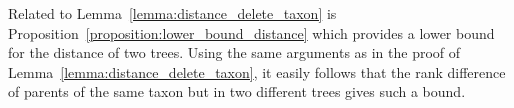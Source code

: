 \documentclass{amsart}
\newcommand{\parent}{\mathrm{parent}}
\newcommand{\rank}{\mathrm{rank}}
\newcommand{\nni}{\mathrm{NNI}}
\begin{document}


Related to Lemma~\ref{lemma:distance_delete_taxon} is Proposition~\ref{proposition:lower_bound_distance} which provides a lower bound for the distance of two trees.
Using the same arguments as in the proof of Lemma~\ref{lemma:distance_delete_taxon}, it easily follows that the rank difference of parents of the same taxon but in two different trees gives such a bound.
\end{document}
